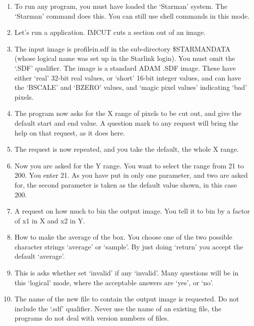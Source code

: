 {\small
\begin{enumerate}

\item To run any \starman program, you must have loaded the `Starman' system.
The `Starman' command does this.  You can still use shell commands
in this mode.

\item Let's run a \starman application.  IMCUT cuts a section out of an
image.

\item The input image is profile{\undersc}in.sdf in the sub-directory
\$STARMAN{\undersc}DATA (whose logical name was set up in the Starlink login).
You must omit the `.SDF' qualifier.  The image is a standard \starman ADAM
.SDF image. These have either `real' 32-bit real values, or `short' 16-bit
integer values, and can have the `BSCALE' and `BZERO' values, and
`magic pixel values' indicating `bad' pixels.

\item The program now asks for the X range of pixels to be cut out,
and give the default start and end value. A question mark to any
\starman request will bring the help on that request, as it does here.

\item The request is now repeated, and you take the default, the whole
X range.

\item Now you are asked for the Y range. You want to select the range
from 21 to 200. You enter 21. As you have put in only
one parameter, and two are asked for, the second parameter is
taken as the default value shown, in this case 200.

\item A request on how much to bin the output image. You tell it to
      bin by a factor of x1 in X and x2 in Y.

\item How to make the average of the box. You choose one of the two
      possible character strings `average' or `sample'. By just doing
      `return' you accept the default `average'.

\item This is asks whether set `invalid' if any `invalid'.
      Many questions will be in this `logical' mode, where the
      acceptable answers are `yes', or `no'.

\item The name of the new file to contain the output image is requested.
      Do not include the `.sdf' qualifier. Never use the name of an
      existing file, the programs do not deal with version numbers
      of files.


\end{enumerate}}
